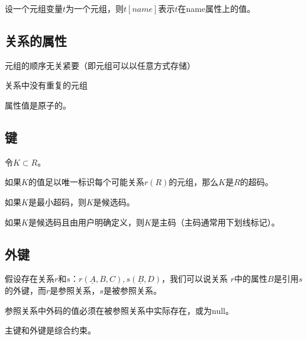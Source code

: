 设一个元组变量$t$为一个元组，则$t[name]$表示$t$在name属性上的值。

\subsection{关系的属性}

元组的顺序无关紧要（即元组可以以任意方式存储）

关系中没有重复的元组

属性值是原子的。

\subsection{键}

令$K\subset R$。

如果$K$的值足以唯一标识每个可能关系$r(R)$的元组，那么$K$是$R$的超码。

如果$K$是最小超码，则$K$是候选码。

如果$K$是候选码且由用户明确定义，则$K$是主码（主码通常用下划线标记）。

\subsection{外键}

假设存在关系$r$和$s$：$r(\underline{A},B,C),s(\underline{B},D)$，我们可以说关系
$r$中的属性$B$是引用$s$的外键，而$r$是参照关系，$s$是被参照关系。

参照关系中外码的值必须在被参照关系中实际存在，或为null。

主键和外键是综合约束。